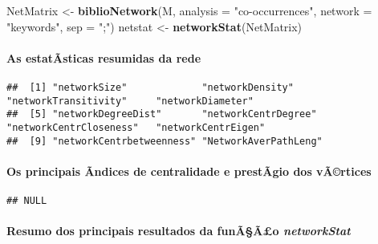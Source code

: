 \documentclass[]{article}
\newenvironment{Shaded}{\begin{snugshade}}{\end{snugshade}}
\newcommand{\KeywordTok}[1]{\textcolor[rgb]{0.13,0.29,0.53}{\textbf{#1}}}
\newcommand{\DataTypeTok}[1]{\textcolor[rgb]{0.13,0.29,0.53}{#1}}
\newcommand{\StringTok}[1]{\textcolor[rgb]{0.31,0.60,0.02}{#1}}
\newcommand{\OperatorTok}[1]{\textcolor[rgb]{0.81,0.36,0.00}{\textbf{#1}}}
\newcommand{\NormalTok}[1]{#1}
\let\oldparagraph\paragraph
\renewcommand{\paragraph}[1]{\oldparagraph{#1}\mbox{}}
\begin{document}
\begin{Shaded}
\begin{Highlighting}[]
\NormalTok{NetMatrix <-}\StringTok{ }\KeywordTok{biblioNetwork}\NormalTok{(M, }\DataTypeTok{analysis =} \StringTok{"co-occurrences"}\NormalTok{, }\DataTypeTok{network =} \StringTok{"keywords"}\NormalTok{, }\DataTypeTok{sep =} \StringTok{";"}\NormalTok{)}
\NormalTok{netstat <-}\StringTok{ }\KeywordTok{networkStat}\NormalTok{(NetMatrix)}
\end{Highlighting}
\end{Shaded}

\paragraph{As estatÃ­sticas resumidas da
rede}\label{as-estatasticas-resumidas-da-rede}

\begin{Shaded}
\end{Shaded}

\begin{verbatim}
##  [1] "networkSize"             "networkDensity"          "networkTransitivity"     "networkDiameter"        
##  [5] "networkDegreeDist"       "networkCentrDegree"      "networkCentrCloseness"   "networkCentrEigen"      
##  [9] "networkCentrbetweenness" "NetworkAverPathLeng"
\end{verbatim}

\paragraph{Os principais Ã­ndices de centralidade e prestÃ­gio dos
vÃ©rtices}\label{os-principais-andices-de-centralidade-e-prestagio-dos-vartices}

\begin{Shaded}
\end{Shaded}

\begin{verbatim}
## NULL
\end{verbatim}

\paragraph{\texorpdfstring{Resumo dos principais resultados da funÃ§Ã£o
\emph{networkStat}}{Resumo dos principais resultados da funÃ§Ã£o networkStat}}\label{resumo-dos-principais-resultados-da-funaao-networkstat}
\end{document}

